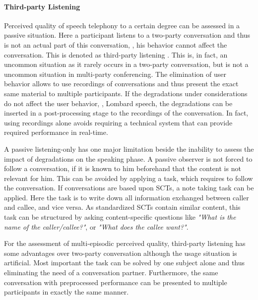 \paragraph*{Third-party Listening}
Perceived quality of speech telephony to a certain degree can be assessed in a passive situation.
Here a participant listens to a two-party conversation and thus is not an actual part of this conversation, \ie, his behavior cannot affect the conversation.
This is denoted as third-party listening \citep[\cf,][p.~13]{itu-t_p.832:_2000}.
This is, in fact, an uncommon situation as it rarely occurs in a two-party conversation, but is not a uncommon situation in multi-party conferencing.
The elimination of user behavior allows to use recordings of conversations and thus present the exact same material to multiple participants.
If the degradations under considerations do not affect the user behavior, \eg, Lombard speech, the degradations can be inserted in a post-processing stage to the recordings of the conversation.
In fact, using recordings alone avoids requiring a technical system that can provide required performance in real-time.

A passive listening-only has one major limitation beside the inability to assess the impact of degradations on the speaking phase.
A passive observer is not forced to follow a conversation, if it is known to him beforehand that the content is not relevant for him.
This can be avoided by applying a task, which requires to follow the conversation.
If conversations are based upon \acp{SCT}, a note taking task can be applied.
Here the task is to write down all information exchanged between caller and callee, and vice versa.
As standardized \acp{SCT} contain similar content, this task can be structured by asking content-specific questions like \emph{"What is the name of the caller/callee?"}, or \emph{"What does the callee want?"}.

For the assessment of multi-episodic perceived quality, third-party listening has some advantages over two-party conversation although the usage situation is artificial.
Most important the task can be solved by one subject alone and thus eliminating the need of a conversation partner.
Furthermore, the same conversation with preprocessed performance can be presented to multiple participants in exactly the same manner.

